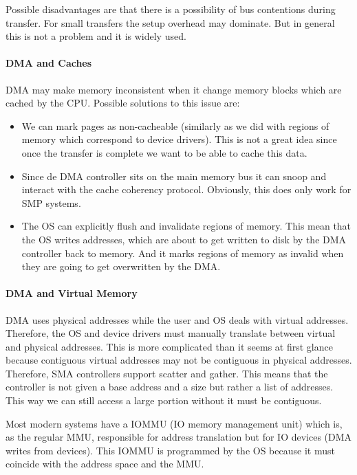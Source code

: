 Possible disadvantages are that there is a possibility of bus contentions during transfer. For small transfers the setup overhead may dominate. But in general this is not a problem and it is widely used.

\paragraph{DMA and Caches}
DMA may make memory inconsistent when it change memory blocks which are cached by the CPU. Possible solutions to this issue are:

\begin{itemize}
    \item We can mark pages as non-cacheable (similarly as we did with regions of memory which correspond to device drivers). This is not a great idea since once the transfer is complete we want to be able to cache this data.
    \item Since de DMA controller sits on the main memory bus it can snoop and interact with the cache coherency protocol. Obviously, this does only work for SMP systems.
    \item The OS can explicitly flush and invalidate regions of memory. This mean that the OS writes addresses, which are about to get written to disk by the DMA controller back to memory. And it marks regions of memory as invalid when they are going to get overwritten by the DMA.
\end{itemize}

\paragraph{DMA and Virtual Memory}
DMA uses physical addresses while the user and OS deals with virtual addresses. Therefore, the OS and device drivers must manually translate between virtual and physical addresses. This is more complicated than it seems at first glance because contiguous virtual addresses may not be contiguous in physical addresses. Therefore, SMA controllers support scatter and gather. This means that the controller is not given a base address and a size but rather a list of addresses. This way we can still access a large portion without it must be contiguous.

Most modern systems have a IOMMU (IO memory management unit) which is, as the regular MMU, responsible for address translation but for IO devices (DMA writes from devices). This IOMMU is programmed by the OS because it must coincide with the address space and the MMU.


